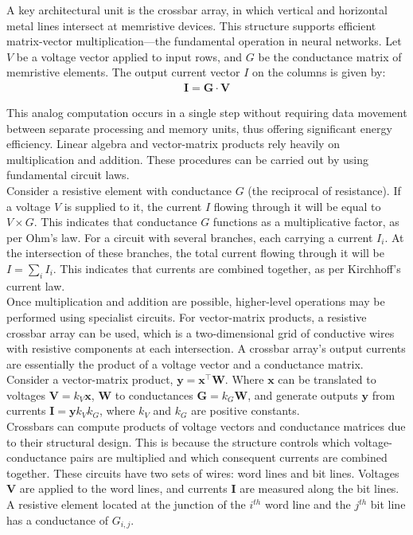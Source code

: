 \noindent A key architectural unit is the crossbar array, in which vertical and horizontal metal lines intersect at memristive devices. This structure supports efficient matrix-vector multiplication—the fundamental operation in neural networks. Let $V$ be a voltage vector applied to input rows, and $G$ be the conductance matrix of memristive elements. The output current vector $I$ on the columns is given by:
\begin{align}
    \mathbf{I} = \mathbf{G} \cdot \mathbf{V} \label{eq:2.30}
\end{align}

\noindent This analog computation occurs in a single step without requiring data movement between separate processing and memory units, thus offering significant energy efficiency. Linear algebra and vector-matrix products rely heavily on multiplication and addition. These procedures can be carried out by using fundamental circuit laws. \\

\noindent Consider a resistive element with conductance $G$ (the reciprocal of resistance). If a voltage $V$ is supplied to it, the current $I$ flowing through it will be equal to $V \times G$. This indicates that conductance $G$ functions as a multiplicative factor, as per Ohm's law. For a circuit with several branches, each carrying a current $I_i$. At the intersection of these branches, the total current flowing through it will be $I = \sum_{i}^{} I_i$. This indicates that currents are combined together, as per Kirchhoff's current law. \\

\noindent Once multiplication and addition are possible, higher-level operations may be performed using specialist circuits. For vector-matrix products, a resistive crossbar array can be used, which is a two-dimensional grid of conductive wires with resistive components at each intersection. A crossbar array's output currents are essentially the product of a voltage vector and a conductance matrix. Consider a vector-matrix product, $\mathbf{y} = \mathbf{x}^\intercal \mathbf{W}$. Where $\mathbf{x}$ can be translated to voltages $\mathbf{V} = k_V\mathbf{x}$, $\mathbf{W}$ to conductances $\mathbf{G} = k_G \mathbf{W}$, and generate outputs $\mathbf{y}$ from currents $\mathbf{I} = \mathbf{y} k_V k_G $, where $k_V$ and $k_G$ are positive constants. \\


\noindent Crossbars can compute products of voltage vectors and conductance matrices due to their structural design. This is because the structure controls which voltage-conductance pairs are multiplied and which consequent currents are combined together. These circuits have two sets of wires: word lines and bit lines. Voltages $\mathbf{V}$ are applied to the word lines, and currents $\mathbf{I}$ are measured along the bit lines. A resistive element located at the junction of the $i^{th}$ word line and the $j^{th}$ bit line has a conductance of $G_{i,j}$.\\
    
